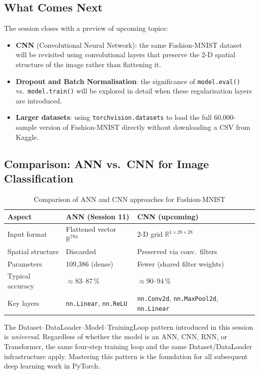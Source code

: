 \documentclass[12pt,a4paper]{article}
\begin{document}
\subsection{What Comes Next}

The session closes with a preview of upcoming topics:

\begin{itemize}
  \item \textbf{CNN} (Convolutional Neural Network): the same Fashion-MNIST
        dataset will be revisited using convolutional layers that preserve
        the 2-D spatial structure of the image rather than flattening it.
  \item \textbf{Dropout and Batch Normalisation}: the significance of
        \texttt{model.eval()} vs.\ \texttt{model.train()} will be explored
        in detail when these regularisation layers are introduced.
  \item \textbf{Larger datasets}: using \texttt{torchvision.datasets} to
        load the full 60{,}000-sample version of Fashion-MNIST directly
        without downloading a CSV from Kaggle.
\end{itemize}

\subsection{Comparison: ANN vs.\ CNN for Image Classification}

\begin{table}[htbp]
  \centering
  \caption{Comparison of ANN and CNN approaches for Fashion-MNIST}
  \label{tab:ann-vs-cnn}
  \begin{tabularx}{\linewidth}{lXX}
    \toprule
    \textbf{Aspect} & \textbf{ANN (Session 11)} & \textbf{CNN (upcoming)} \\
    \midrule
    Input format & Flattened vector $\mathbb{R}^{784}$ &
      2-D grid $\mathbb{R}^{1 \times 28 \times 28}$ \\
    Spatial structure & Discarded & Preserved via conv.\ filters \\
    Parameters & 109{,}386 (dense) &
      Fewer (shared filter weights) \\
    Typical accuracy & $\approx 83\text{--}87\,\%$ &
      $\approx 90\text{--}94\,\%$ \\
    Key layers & \texttt{nn.Linear}, \texttt{nn.ReLU} &
      \texttt{nn.Conv2d}, \texttt{nn.MaxPool2d}, \texttt{nn.Linear} \\
    \bottomrule
  \end{tabularx}
\end{table}

\begin{keyinsight}[title=Core Takeaway]
The Dataset--DataLoader--Model--TrainingLoop pattern introduced in this
session is \emph{universal}.  Regardless of whether the model is an ANN, CNN,
RNN, or Transformer, the same four-step training loop and the same
Dataset/DataLoader infrastructure apply.  Mastering this pattern is the
foundation for all subsequent deep learning work in PyTorch.
\end{keyinsight}
\end{document}
